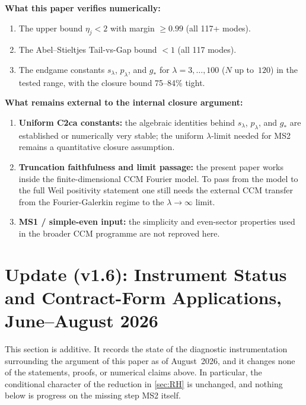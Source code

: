 \documentclass[12pt,a4paper]{article}
\theoremstyle{definition}
\theoremstyle{remark}
\begin{document}
\noindent\textbf{What this paper verifies numerically:}
\begin{enumerate}[label=(\roman*)]
\item The upper bound $\eta_j < 2$ with margin $\geq 0.99$ (all 117+ modes).
\item The Abel--Stieltjes Tail-vs-Gap bound $< 1$ (all 117 modes).
\item The endgame constants $s_\lambda$, $p_\lambda$, and $g_*$ for
  $\lambda = 3, \ldots, 100$ ($N$ up to~$120$) in the tested range,
  with the closure bound 75--84\% tight.
\end{enumerate}

\noindent\textbf{What remains external to the internal closure argument:}
\begin{enumerate}[label=(O\arabic*)]
\item \textbf{Uniform C2ca constants:} the algebraic identities behind
  $s_\lambda$, $p_\lambda$, and $g_*$ are established or numerically very
  stable; the uniform $\lambda$-limit needed for MS2 remains a quantitative
  closure assumption.
\item \textbf{Truncation faithfulness and limit passage:} the present
  paper works inside the finite-dimensional CCM Fourier model.  To pass
  from the model to the full Weil positivity statement one still needs
  the external CCM transfer from the Fourier-Galerkin regime to the
  $\lambda\to\infty$ limit.
\item \textbf{MS1 / simple-even input:} the simplicity and even-sector
  properties used in the broader CCM programme are not reproved here.
\end{enumerate}

\bigskip

\section{Update (v1.6): Instrument Status and Contract-Form Applications,
June--August 2026}
\label{sec:update-v16}

This section is additive.  It records the state of the diagnostic
instrumentation surrounding the argument of this paper as of
August~2026, and it changes none of the statements, proofs, or numerical
claims above.  In particular, the conditional character of the reduction
in \cref{sec:RH} is unchanged, and nothing below is progress on the
missing step MS2 itself.
\end{document}
